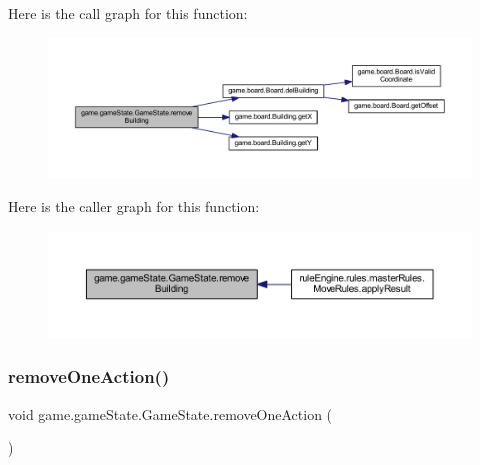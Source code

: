 Here is the call graph for this function\+:
\nopagebreak
\begin{figure}[H]
\begin{center}
\leavevmode
\includegraphics[width=350pt]{classgame_1_1game_state_1_1_game_state_ac1a1d226c2aee2ff606c94ec1f2d2243_cgraph}
\end{center}
\end{figure}
Here is the caller graph for this function\+:
\nopagebreak
\begin{figure}[H]
\begin{center}
\leavevmode
\includegraphics[width=350pt]{classgame_1_1game_state_1_1_game_state_ac1a1d226c2aee2ff606c94ec1f2d2243_icgraph}
\end{center}
\end{figure}
\mbox{\label{classgame_1_1game_state_1_1_game_state_af28ff27a89c8b57b67919e5cf17982c5}} 
\subsubsection{\texorpdfstring{remove\+One\+Action()}{removeOneAction()}}
{\footnotesize\ttfamily void game.\+game\+State.\+Game\+State.\+remove\+One\+Action (\begin{DoxyParamCaption}{ }\end{DoxyParamCaption})\hspace{0.3cm}{\ttfamily [inline]}}

